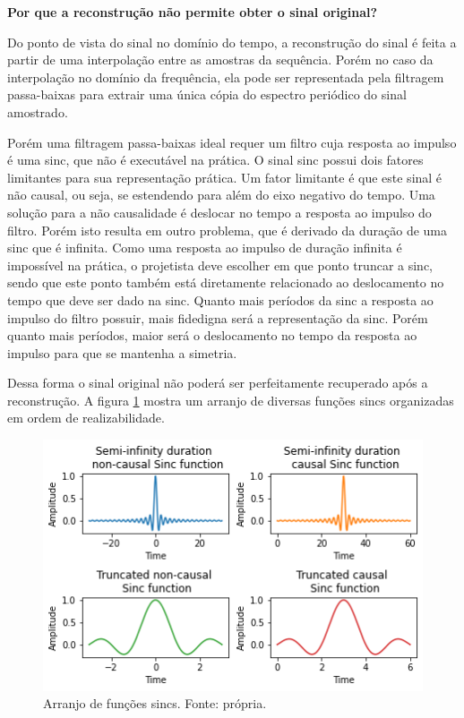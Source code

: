\textbf{Por que a reconstrução não permite obter o sinal original?}

Do ponto de vista do sinal no domínio do tempo, a reconstrução do sinal é feita a partir de uma interpolação entre as amostras da sequência. Porém no caso da interpolação no domínio da frequência, ela pode ser representada pela filtragem passa-baixas para extrair uma única cópia do espectro periódico do sinal amostrado.

Porém uma filtragem passa-baixas ideal requer um filtro cuja resposta ao impulso é uma sinc, que não é executável na prática. O sinal sinc possui dois fatores limitantes para sua representação prática. Um fator limitante é que este sinal é não causal, ou seja, se estendendo para além do eixo negativo do tempo. Uma solução para a não causalidade é deslocar no tempo a resposta ao impulso do filtro. Porém isto resulta em outro problema, que é derivado da duração de uma sinc que é infinita. Como uma resposta ao impulso de duração infinita é impossível na prática, o projetista deve escolher em que ponto truncar a sinc, sendo que este ponto também está diretamente relacionado ao deslocamento no tempo que deve ser dado na sinc. Quanto mais períodos da sinc a resposta ao impulso do filtro possuir, mais fidedigna será a representação da sinc. Porém quanto mais períodos, maior será o deslocamento no tempo da resposta ao impulso para que se mantenha a simetria.

Dessa forma o sinal original não poderá ser perfeitamente recuperado após a reconstrução. A figura \ref{sincs} mostra um arranjo de diversas funções sincs organizadas em ordem de realizabilidade.

\begin{figure}[H] 
\centering
\includegraphics[width=13cm]{images/sincs.png}
\caption{Arranjo de funções sincs. Fonte: própria.}
\label{sincs} 
\end{figure}

